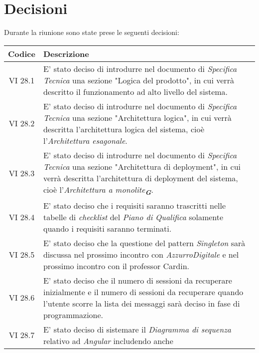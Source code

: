 
\section{Decisioni}

Durante la riunione sono state prese le seguenti decisioni:

\vspace{0.5cm}

\begin{table}[htbp]
    \centering
    \begin{tabular}{|c|p{}|}
        \hline
        \rowcolor[gray]{0.75}
        \textbf{Codice} & \textbf{Descrizione}\\
        \hline
        VI 28.1 & E' stato deciso di introdurre nel documento di \emph{Specifica Tecnica} una sezione "Logica del prodotto",
        in cui verrà descritto il funzionamento ad alto livello del sistema.\\
        \hline
        VI 28.2 & E' stato deciso di introdurre nel documento di \emph{Specifica Tecnica} una sezione "Architettura logica",
        in cui verrà descritta l'architettura logica del sistema, cioè l'\emph{Architettura esagonale}.\\
        \hline
        VI 28.3 & E' stato deciso di introdurre nel documento di \emph{Specifica Tecnica} una sezione "Architettura di deployment",
        in cui verrà descritta l'architettura di deployment del sistema, cioè l'\emph{Architettura a monolite}\textsubscript{\textit{\textbf{G}}}.\\
        \hline
        VI 28.4 & E' stato deciso che i requisiti saranno trascritti nelle tabelle di \emph{checklist} del \emph{Piano di Qualifica}
        solamente quando i requisiti saranno terminati.\\
        \hline
        VI 28.5 & E' stato deciso che la questione del pattern \emph{Singleton} sarà discussa nel prossimo incontro con
        \emph{AzzurroDigitale} e nel prossimo incontro con il professor Cardin.\\
        \hline
        VI 28.6 & E' stato deciso che il numero di sessioni da recuperare inizialmente e il numero di sessioni da recuperare
        quando l'utente scorre la lista dei messaggi sarà deciso in fase di programmazione.\\
        \hline
        VI 28.7 & E' stato deciso di sistemare il \emph{Diagramma di sequenza} relativo ad \emph{Angular} includendo anche 

\end{tabular}
\end{table}
